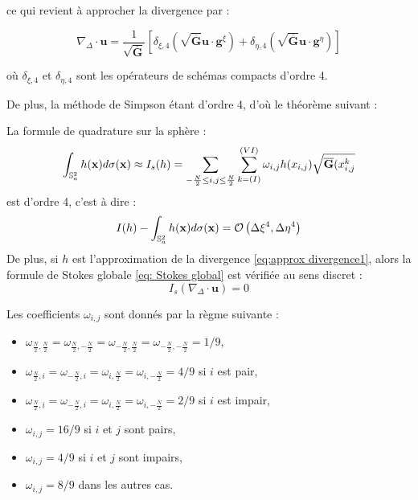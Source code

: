 ce qui revient à approcher la divergence par :

\begin{equation}
\nabla_{\Delta} \cdot \mathbf{u} =\dfrac{1}{\sqrt{\overline{\mathbf{G}}}} \left[ \delta_{\xi,4} \left( \sqrt{\overline{\mathbf{G}}} \mathbf{u} \cdot \mathbf{g}^{\xi} \right) +\delta_{\eta,4} \left( \sqrt{\overline{\mathbf{G}}} \mathbf{u} \cdot \mathbf{g}^{\eta} \right)  \right]
\label{eq:approx divergence1}
\end{equation}

où $\delta_{\xi,4}$ et $\delta_{\eta,4}$ sont les opérateurs de schémas compacts d'ordre 4.

De plus, la méthode de Simpson étant d'ordre 4, d'où le théorème suivant :

\begin{theoreme}
La formule de quadrature sur la sphère :
\begin{equation}
\displaystyle\int_{\mathbb{S}_a^2} h(\mathbf{x}) d\sigma(\mathbf{x}) \approx I_s(h)=\displaystyle\sum\limits_{-\frac{N}{2} \leq i,j \leq \frac{N}{2}} \displaystyle\sum\limits_{k=(I)}^{(VI)} \omega_{i,j} h(x_{i,j})\sqrt{\overline{\mathbf{G}}(x_{i,j}^k}
\label{eq:quadrature simpson}
\end{equation}
est d'ordre 4, c'est à dire :
\begin{equation}
I(h)- \displaystyle\int_{\mathbb{S}_a^2} h(\mathbf{x}) d\sigma(\mathbf{x}) = \mathcal{O}\left( \Delta \xi^4,\Delta \eta^4\right)
\end{equation}
De plus, si $h$ est l'approximation de la divergence \eqref{eq:approx divergence1}, alors la formule de Stokes globale \eqref{eq: Stokes global} est vérifiée au sens discret :
\begin{equation}
I_s(\nabla_{\Delta} \cdot \mathbf{u}) = 0
\label{eq: Stokes global I_s}
\end{equation}
\end{theoreme}

\begin{remarque}
Les coefficients $\omega_{i,j}$ sont donnés par la règme suivante :
\begin{itemize}
\item $\omega_{\frac{N}{2},\frac{N}{2}}=\omega_{\frac{N}{2},-\frac{N}{2}}=\omega_{-\frac{N}{2},\frac{N}{2}}=\omega_{-\frac{N}{2},-\frac{N}{2}}=1/9$,
\item $\omega_{\frac{N}{2},i}=\omega_{-\frac{N}{2},i}=\omega_{i,\frac{N}{2}}=\omega_{i,-\frac{N}{2}}=4/9$ si $i$ est pair,
\item $\omega_{\frac{N}{2},i}=\omega_{-\frac{N}{2},i}=\omega_{i,\frac{N}{2}}=\omega_{i,-\frac{N}{2}}=2/9$ si $i$ est impair,
\item $\omega_{i,j}=16/9$ si $i$ et $j$ sont pairs,
\item $\omega_{i,j}=4/9$ si $i$ et $j$ sont impairs,
\item $\omega_{i,j}=8/9$ dans les autres cas.
\end{itemize}
\end{remarque}

